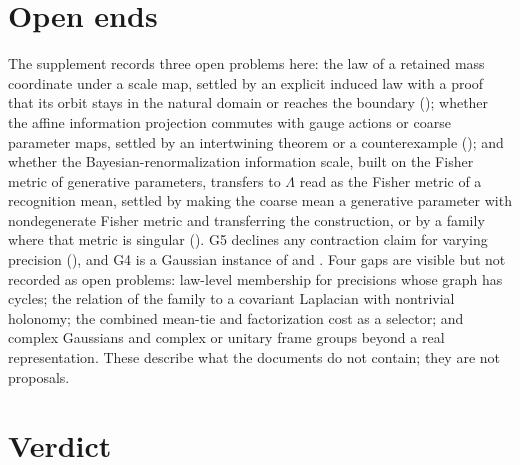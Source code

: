 \section{Open ends}
\label{comp:sg1-open}

The supplement records three open problems here: the law of a retained mass coordinate under a scale
map, settled by an explicit induced law with a proof that its orbit stays in the natural domain or
reaches the boundary (); whether the affine information projection commutes with
gauge actions or coarse parameter maps, settled by an intertwining theorem or a counterexample
(); and whether the Bayesian-renormalization information scale, built
on the Fisher metric of generative parameters, transfers to \(\Lambda\) read as the Fisher metric of a
recognition mean, settled by making the coarse mean a generative parameter with nondegenerate Fisher
metric and transferring the construction, or by a family where that metric is singular
(). G5 declines any contraction claim for varying precision
(), and G4 is a Gaussian instance of
 and . Four gaps are visible but not recorded as open problems: law-level
membership for precisions whose graph has cycles; the relation of the family to a covariant Laplacian
with nontrivial holonomy; the combined mean-tie and factorization cost as a selector; and complex
Gaussians and complex or unitary frame groups beyond a real representation. These describe what the
documents do not contain; they are not proposals.

\section{Verdict}
\label{comp:sg1-verdict}

